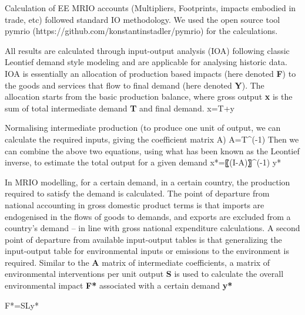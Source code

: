 Calculation of EE MRIO accounts (Multipliers, Footprints, impacts embodied in trade, etc) followed
standard IO methodology. We used the open source tool pymrio (https://github.com/konstantinstadler/pymrio) for the calculations.

All results are  calculated through input-output analysis (IOA) following classic Leontief demand style modeling and are applicable for analysing historic data. IOA is essentially an allocation of production based impacts (here denoted \textbf{F}) to the goods and services that flow to final demand (here denoted \textbf{Y}). The allocation starts from the basic production balance, where gross output \textbf{x} is the sum of total intermediate demand \textbf{T} and final demand. x=T+y

Normalising intermediate production (to produce one unit of output, we can calculate the required inputs, giving the coefficient matrix A)
A=T^(-1) 
Then we can combine the above two equations, using what has been known as the Leontief inverse, to estimate the total output for a given demand
x*=〖(I-A)〗^(-1) y*

In MRIO modelling, for a certain demand, in a certain country, the production required to satisfy the demand is calculated. The point of departure from national accounting in gross domestic product terms is that imports are endogenised in the flows of goods to demands, and exports are excluded from a country’s demand – in line with gross national expenditure calculations. A second point of departure from available input-output tables is that generalizing the input-output table for environmental inputs or emissions to the environment is required. Similar to the \textbf{A} matrix of intermediate coefficients, a matrix of environmental interventions per unit output \textbf{S} is used to calculate the overall environmental impact \textbf{F*} associated with a certain demand \textbf{y*} 

F*=SLy*

